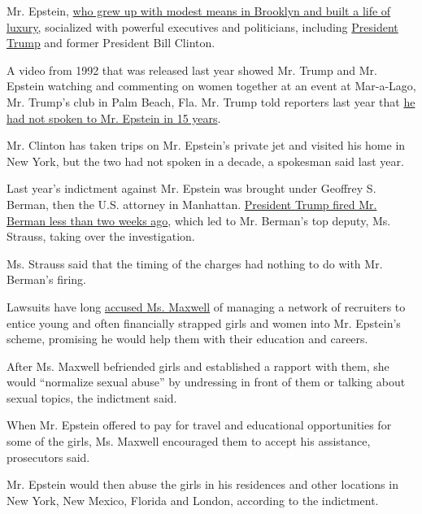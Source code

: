 Mr. Epstein,
\href{https://www.nytimes3xbfgragh.onion/2019/07/10/business/jeffrey-epstein-net-worth.html}{who
grew up with modest means in Brooklyn and built a life of luxury,}
socialized with powerful executives and politicians, including
\href{https://www.nytimes3xbfgragh.onion/2020/07/21/nyregion/trump-ghislaine-maxwell-jeffrey-epstein.html}{President
Trump} and former President Bill Clinton.

A video from 1992 that was released last year showed Mr. Trump and Mr.
Epstein watching and commenting on women together at an event at
Mar-a-Lago, Mr. Trump's club in Palm Beach, Fla. Mr. Trump told
reporters last year that
\href{https://www.nytimes3xbfgragh.onion/2019/07/17/us/politics/trump-jeffrey-epstein-video.html}{he
had not spoken to Mr. Epstein in 15 years}.

Mr. Clinton has taken trips on Mr. Epstein's private jet and visited his
home in New York, but the two had not spoken in a decade, a spokesman
said last year.

Last year's indictment against Mr. Epstein was brought under Geoffrey S.
Berman, then the U.S. attorney in Manhattan.
\href{https://www.nytimes3xbfgragh.onion/2020/06/20/nyregion/trump-geoffrey-berman-fired-sdny.html}{President
Trump fired Mr. Berman less than two weeks ago}, which led to Mr.
Berman's top deputy, Ms. Strauss, taking over the investigation.

Ms. Strauss said that the timing of the charges had nothing to do with
Mr. Berman's firing.

Lawsuits have long
\href{https://www.nytimes3xbfgragh.onion/2019/08/14/style/ghislaine-maxwell-terramar-boats-jeffrey-epstein.html}{accused
Ms. Maxwell} of managing a network of recruiters to entice young and
often financially strapped girls and women into Mr. Epstein's scheme,
promising he would help them with their education and careers.

After Ms. Maxwell befriended girls and established a rapport with them,
she would ``normalize sexual abuse'' by undressing in front of them or
talking about sexual topics, the indictment said.

When Mr. Epstein offered to pay for travel and educational opportunities
for some of the girls, Ms. Maxwell encouraged them to accept his
assistance, prosecutors said.

Mr. Epstein would then abuse the girls in his residences and other
locations in New York, New Mexico, Florida and London, according to the
indictment.

